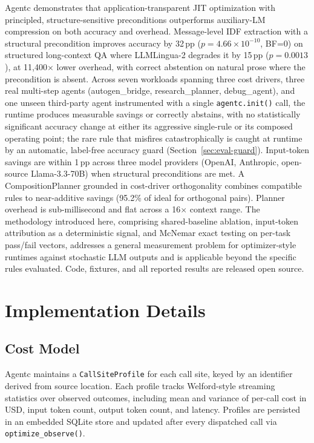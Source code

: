 \documentclass[sigconf,9pt]{acmart}
\begin{document}
Agentc demonstrates that application-transparent JIT optimization with principled,
structure-sensitive preconditions outperforms auxiliary-LM compression on both
accuracy and overhead. Message-level IDF extraction with a structural precondition
improves accuracy by 32\,pp ($p=4.66\times10^{-10}$, BF=0) on structured long-context
QA where LLMLingua-2 degrades it by 15\,pp ($p=0.0013$), at 11{,}400$\times$ lower
overhead, with correct abstention on natural prose where the precondition is absent.
Across seven workloads spanning three cost drivers, three real multi-step agents
(autogen\_bridge, research\_planner, debug\_agent), and one unseen third-party agent
instrumented with a single \texttt{agentc.init()} call, the runtime produces
measurable savings or correctly abstains, with no statistically significant accuracy
change at either its aggressive single-rule or its composed operating point; the rare
rule that misfires catastrophically is caught at runtime by an automatic, label-free
accuracy guard (Section~\ref{sec:eval-guard}). Input-token savings are within 1\,pp across
three model providers (OpenAI, Anthropic, open-source Llama-3.3-70B) when structural
preconditions are met. A CompositionPlanner grounded in cost-driver orthogonality
combines compatible rules to near-additive savings (95.2\% of ideal for orthogonal
pairs). Planner overhead is sub-millisecond and flat across a 16$\times$ context
range. The methodology introduced here, comprising shared-baseline ablation,
input-token attribution as a deterministic signal, and McNemar exact testing on
per-task pass/fail vectors, addresses a general measurement problem for
optimizer-style runtimes against stochastic LLM outputs and is applicable beyond the
specific rules evaluated. Code, fixtures, and all reported results are released open
source.

\appendix

\section{Implementation Details}
\label{app:impl}
\subsection{Cost Model}

Agentc maintains a \texttt{CallSiteProfile} for each call site, keyed by an
identifier derived from source location. Each profile tracks Welford-style streaming
statistics over observed outcomes, including mean and variance of per-call cost in
USD, input token count, output token count, and latency. Profiles are persisted in an
embedded SQLite store and updated after every dispatched call via
\texttt{optimize\_observe()}.
\end{document}
